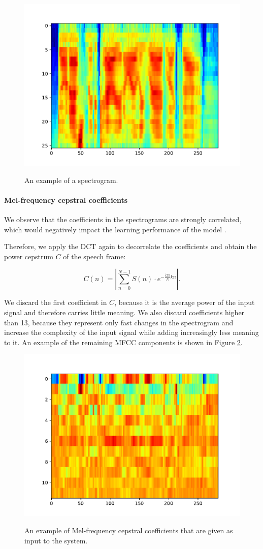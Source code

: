 			\begin{figure}[ht]
				\centering
			    \includegraphics[width=.45\linewidth]{gfx/spectrogram}
			    \label{fig:spectrogram}
			    \caption{An example of a spectrogram.}
			\end{figure}

		\paragraph{Mel-frequency cepstral coefficients}

			We observe that the coefficients in the spectrograms are strongly correlated, which would negatively impact the learning performance of the model .

			Therefore, we apply the DCT again to decorrelate the coefficients and obtain the power cepstrum $C$ of the speech frame:

			\begin{equation}\label{eq:magframes}
				C(n) = \left|\sum_{n=0}^{N-1}S(n)\cdot e^{-\frac{i2\pi}{N}kn}\right|.
			\end{equation}

			We discard the first coefficient in $C$, because it is the average power of the input signal and therefore carries little meaning.
			We also discard coefficients higher than 13, because they represent only fast changes in the spectrogram and increase the complexity of the input signal while adding increasingly less meaning to it.
			An example of the remaining MFCC components is shown in Figure \ref{fig:mfccs}.

			\begin{figure}[ht]
				\centering
			    \includegraphics[width=.45\linewidth]{gfx/mfcc}
			    \label{fig:mfccs}
			    \caption{An example of Mel-frequency cepstral coefficients that are given as input to the system.}
			\end{figure}

